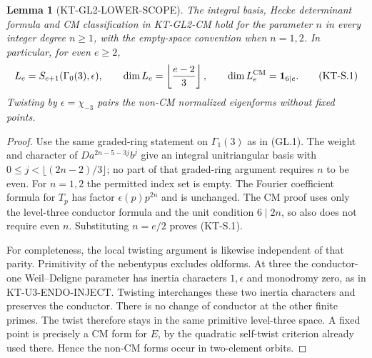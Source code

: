 \documentclass[11pt,a4paper]{article}
\newtheorem{lemma}[theorem]{Lemma}
\theoremstyle{definition}
\begin{document}
\begin{lemma}[KT-GL2-LOWER-SCOPE]
The integral basis, Hecke determinant formula and CM classification
in KT-GL2-CM hold for the parameter $n$ in every integer degree
$n\geq1$, with the empty-space convention when $n=1,2$.
In particular, for even $e\geq2$,
\[
 L_e=S_{e+1}(\Gamma_0(3),\epsilon),\qquad
 \dim L_e=\left\lfloor\frac{e-2}{3}\right\rfloor,
 \qquad
 \dim L_e^{\rm CM}={\bf1}_{6\mid e}.                 \tag{KT-S.1}
\]
Twisting by $\epsilon=\chi_{-3}$ pairs the non-CM normalized
eigenforms without fixed points.
\end{lemma}
\begin{proof}
Use the same graded-ring statement on $\Gamma_1(3)$ as in (GL.1).
The weight and character of $Da^{2n-5-3j}b^j$ give an integral
unitriangular basis with $0\leq j<\lfloor(2n-2)/3\rfloor$;
no part of that graded-ring argument requires $n$ to be even.
For $n=1,2$ the permitted index set is empty.  The Fourier
coefficient formula for $T_p$ has factor $\epsilon(p)p^{2n}$
and is unchanged.  The CM proof uses only the level-three
conductor formula and the unit condition $6\mid2n$, so also
does not require even $n$.  Substituting $n=e/2$ proves (KT-S.1).

For completeness, the local twisting argument is likewise
independent of that parity.  Primitivity of the nebentypus
excludes oldforms.  At three the conductor-one Weil--Deligne
parameter has inertia characters $1,\epsilon$ and monodromy
zero, as in KT-U3-ENDO-INJECT.  Twisting interchanges these
two inertia characters and preserves the conductor.  There
is no change of conductor at the other finite primes.
The twist therefore stays in the same primitive level-three
space.  A fixed point is precisely a CM form for $E$, by the
quadratic self-twist criterion already used there.  Hence the
non-CM forms occur in two-element orbits.
\end{proof}
\end{document}
